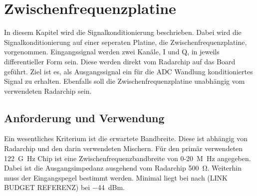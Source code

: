 \chapter{Zwischenfrequenzplatine}
In diesem Kapitel wird die Signalkonditionierung beschrieben. Dabei wird die Signalkonditionierung auf einer seperaten Platine, die Zwischenfrequenzplatine, vorgenommen. Eingangssignal werden zwei Kanäle, I und Q, in jeweils differentieller Form sein. Diese werden direkt vom Radarchip auf das Board geführt. Ziel ist es, als Ausgangssignal ein für die ADC Wandlung konditioniertes Signal zu erhalten. Ebenfalls soll die Zwischenfrequenzplatine unabhängig vom verwendeten Radarchip sein. 
\section{Anforderung und Verwendung}
Ein wesentliches Kriterium ist die erwartete Bandbreite. Diese ist abhängig von Radarchip und den darin verwendeten Mischern. Für den primär verwendeten \SI{122}{G\hertz} Chip ist eine Zwischenfrequenzbandbreite von 0-\SI{20}{M\hertz} angegeben. Dabei ist die Ausgangsimpedanz ausgehend vom Radarchip \SI{500}{\ohm}. Weiterhin muss der Eingangspegel bestimmt werden. Minimal liegt bei nach (LINK BUDGET REFERENZ) bei \SI{-44}{dBm}.
